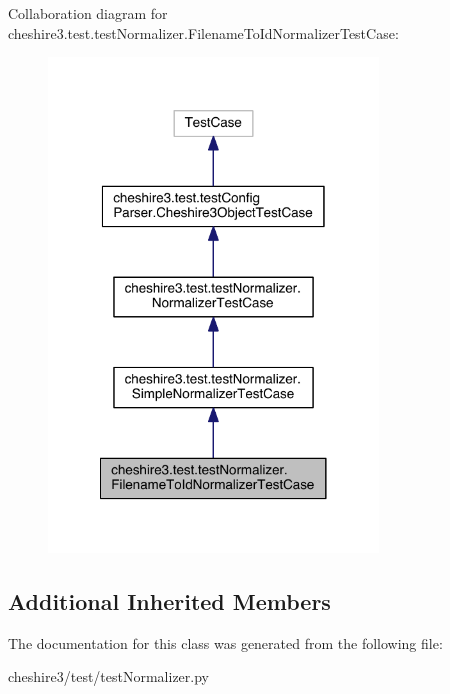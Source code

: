 Collaboration diagram for cheshire3.\-test.\-test\-Normalizer.\-Filename\-To\-Id\-Normalizer\-Test\-Case\-:
\nopagebreak
\begin{figure}[H]
\begin{center}
\leavevmode
\includegraphics[width=248pt]{classcheshire3_1_1test_1_1test_normalizer_1_1_filename_to_id_normalizer_test_case__coll__graph}
\end{center}
\end{figure}
\subsection*{Additional Inherited Members}


The documentation for this class was generated from the following file\-:\begin{DoxyCompactItemize}
\item 
cheshire3/test/test\-Normalizer.\-py\end{DoxyCompactItemize}
